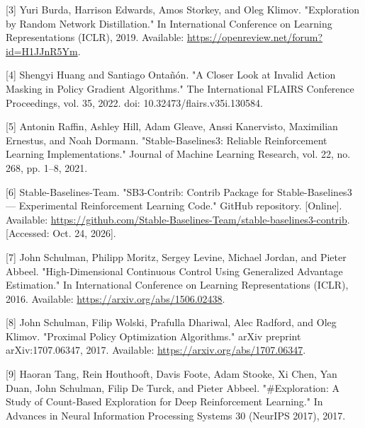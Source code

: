 \documentclass[11pt,a4paper]{article}
\begin{document}
[3] Yuri Burda, Harrison Edwards, Amos Storkey, and Oleg Klimov.
    "Exploration by Random Network Distillation."
    In International Conference on Learning Representations (ICLR),
    2019. Available: \url{https://openreview.net/forum?id=H1JJnR5Ym}.

[4] Shengyi Huang and Santiago Ontañón.
    "A Closer Look at Invalid Action Masking in Policy Gradient
    Algorithms." The International FLAIRS Conference Proceedings,
    vol. 35, 2022. doi: 10.32473/flairs.v35i.130584.

[5] Antonin Raffin, Ashley Hill, Adam Gleave, Anssi Kanervisto,
    Maximilian Ernestus, and Noah Dormann.
    "Stable-Baselines3: Reliable Reinforcement Learning Implementations."
    Journal of Machine Learning Research, vol. 22, no. 268,
    pp. 1–8, 2021.

[6] Stable-Baselines-Team. "SB3-Contrib: Contrib Package for
    Stable-Baselines3 — Experimental Reinforcement Learning Code."
    GitHub repository. [Online]. Available:
    \url{https://github.com/Stable-Baselines-Team/stable-baselines3-contrib}.
    [Accessed: Oct. 24, 2026].

[7] John Schulman, Philipp Moritz, Sergey Levine, Michael Jordan,
    and Pieter Abbeel. "High-Dimensional Continuous Control Using
    Generalized Advantage Estimation."
    In International Conference on Learning Representations (ICLR),
    2016. Available: \url{https://arxiv.org/abs/1506.02438}.

[8] John Schulman, Filip Wolski, Prafulla Dhariwal, Alec Radford,
    and Oleg Klimov. "Proximal Policy Optimization Algorithms."
    arXiv preprint arXiv:1707.06347, 2017.
    Available: \url{https://arxiv.org/abs/1707.06347}.

[9] Haoran Tang, Rein Houthooft, Davis Foote, Adam Stooke, Xi Chen,
    Yan Duan, John Schulman, Filip De Turck, and Pieter Abbeel.
    "\#Exploration: A Study of Count-Based Exploration for Deep
    Reinforcement Learning."
    In Advances in Neural Information Processing Systems 30
    (NeurIPS 2017), 2017.
\end{document}
